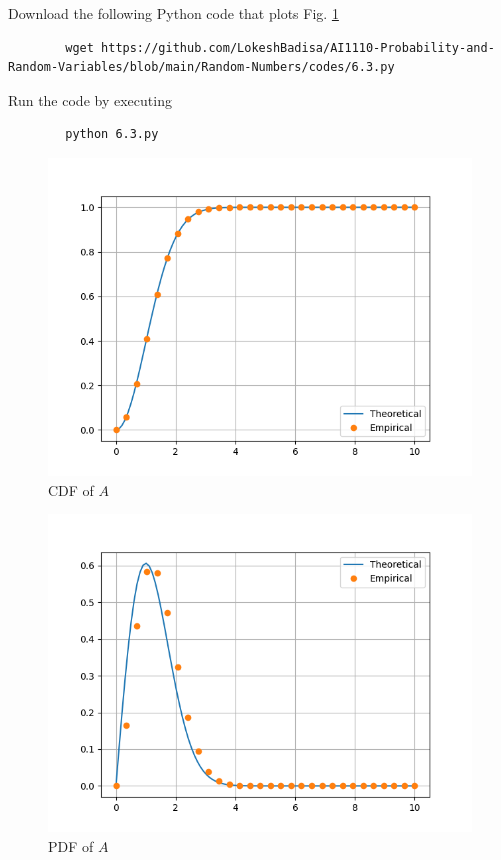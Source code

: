 \documentclass[journal,12pt,twocolumn]{IEEEtran}
\numberwithin{equation}{section}
\renewcommand\thesection{\arabic{section}}
\begin{document}
\begin{enumerate}[label=\thesection.\arabic*,ref=\thesection.\theenumi]
	Download the following Python code that plots Fig. \ref{fig-6.3} 
	\begin{lstlisting}
		wget https://github.com/LokeshBadisa/AI1110-Probability-and-Random-Variables/blob/main/Random-Numbers/codes/6.3.py
	\end{lstlisting}
	Run the code by executing
	\begin{lstlisting}
		python 6.3.py
	\end{lstlisting}
	\begin{figure}
		\centering
		\includegraphics[width=\columnwidth]{./figs/6.3.png}
		\caption{CDF of $A$}
		\label{fig-6.3}
	\end{figure}
	\begin{figure}
		\centering
		\includegraphics[width=\columnwidth]{./figs/6.4.png}
		\caption{PDF of $A$}
		\label{fig-6.4}
	\end{figure}
	

\end{enumerate}
\end{document}
